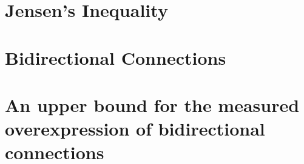 \documentclass{scrreprt}
\begin{document}
  

\section{Jensen's Inequality}

  

\section{Bidirectional Connections}

  

\section{An upper bound for the measured overexpression of bidirectional connections}

  
  
\end{document}
